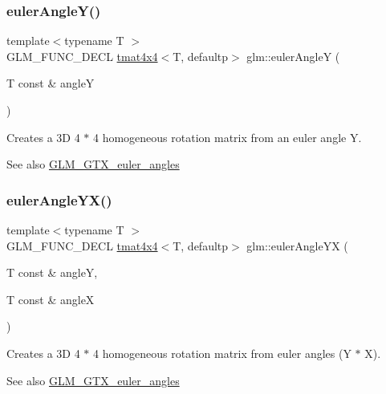 \subsubsection{\texorpdfstring{euler\+Angle\+Y()}{eulerAngleY()}}
{\footnotesize\ttfamily template$<$typename T $>$ \\
G\+L\+M\+\_\+\+F\+U\+N\+C\+\_\+\+D\+E\+CL \hyperlink{structglm_1_1tmat4x4}{tmat4x4}$<$T, defaultp$>$ glm\+::euler\+AngleY (\begin{DoxyParamCaption}\item[{T const \&}]{angleY }\end{DoxyParamCaption})}

Creates a 3D 4 $\ast$ 4 homogeneous rotation matrix from an euler angle Y. \begin{DoxySeeAlso}{See also}
\hyperlink{group__gtx__euler__angles}{G\+L\+M\+\_\+\+G\+T\+X\+\_\+euler\+\_\+angles} 
\end{DoxySeeAlso}
\mbox{\label{group__gtx__euler__angles_gafdd02f9a37511190962119adef5c1c25}} 
\subsubsection{\texorpdfstring{euler\+Angle\+Y\+X()}{eulerAngleYX()}}
{\footnotesize\ttfamily template$<$typename T $>$ \\
G\+L\+M\+\_\+\+F\+U\+N\+C\+\_\+\+D\+E\+CL \hyperlink{structglm_1_1tmat4x4}{tmat4x4}$<$T, defaultp$>$ glm\+::euler\+Angle\+YX (\begin{DoxyParamCaption}\item[{T const \&}]{angleY,  }\item[{T const \&}]{angleX }\end{DoxyParamCaption})}

Creates a 3D 4 $\ast$ 4 homogeneous rotation matrix from euler angles (Y $\ast$ X). \begin{DoxySeeAlso}{See also}
\hyperlink{group__gtx__euler__angles}{G\+L\+M\+\_\+\+G\+T\+X\+\_\+euler\+\_\+angles} 
\end{DoxySeeAlso}
\mbox{\label{group__gtx__euler__angles_ga0242b5ab68651db70c6025815549427f}} 
